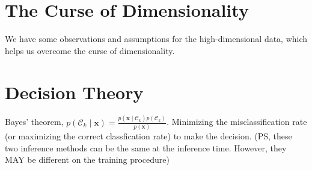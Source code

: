 \documentclass{article}
\begin{document}


\section{The Curse of Dimensionality}
We have some observations and assumptions for the high-dimensional data, which helps us overcome the curse of dimensionality.


\section{Decision Theory}
Bayes’ theorem, $
p\left(\mathcal{C}_{k} \mid \mathbf{x}\right)=\frac{p\left(\mathbf{x} \mid \mathcal{C}_{k}\right) p\left(\mathcal{C}_{k}\right)}{p(\mathbf{x})}
$.
Minimizing the misclassiﬁcation rate (or maximizing the correct classfication rate) to make the decision.
(PS, these two inference methods can be the same at the inference time.  However, they MAY be different on the training procedure)
\end{document}
